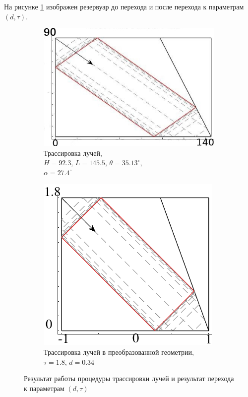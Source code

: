 На рисунке \ref{fig:RayTr923x1455} изображен резервуар до перехода и после перехода к параметрам $(d,\tau)$.

\begin{figure}
    \begin{subfigure}[с]{0.45\textwidth}
        \centering
        \includegraphics[scale=0.45]{Figs/RayTr923x1455.jpeg}
        \caption{Трассировка лучей,\\ $H=92.3$, $L=145.5$, $\theta = 35.13^{\circ}$,\\ $\alpha = 27.4^{\circ}$}
    \end{subfigure}
    \begin{subfigure}[r]{0.45\textwidth}
        \centering
        \includegraphics[scale=0.45]{Figs/RTdtau.png}
        \caption{Трассировка лучей в преобразованной геометрии, \\ $\tau = 1.8$, $d = 0.34$}
    \end{subfigure}
    
    \caption{Результат работы процедуры трассировки лучей и результат перехода к параметрам $(d,\tau)$}

    \label{fig:RayTr923x1455}
\end{figure}

